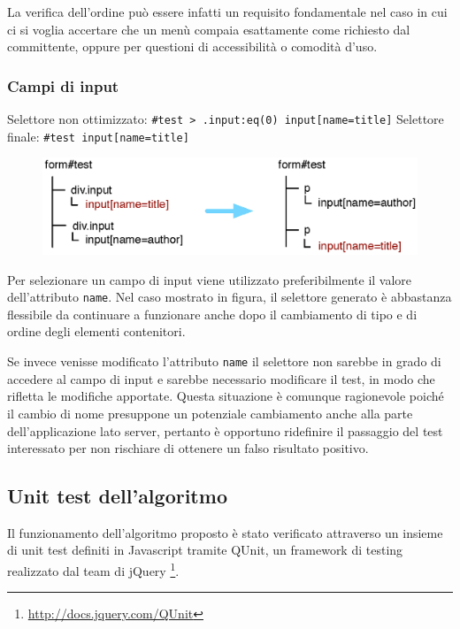 La verifica dell'ordine può essere infatti un requisito fondamentale nel caso in cui ci si voglia accertare che un menù compaia esattamente come richiesto dal committente, oppure per questioni di accessibilità o comodità d'uso.

\subsubsection {Campi di input}

Selettore non ottimizzato:  \verb|#test > .input:eq(0) input[name=title]| 
\newline
Selettore finale:  \verb|#test input[name=title]| 

\begin{figure}[htbp]
\begin{center}
\includegraphics[width=\textwidth]{images/dom_examples/form1.eps}
\end{center}
\end{figure}

Per selezionare un campo di input viene utilizzato preferibilmente il valore dell'attributo \verb|name|. Nel caso mostrato in figura, il selettore generato è abbastanza flessibile da continuare a funzionare anche dopo il cambiamento di tipo e di ordine degli elementi contenitori.

Se invece venisse modificato l'attributo \verb|name| il selettore non sarebbe in grado di accedere al campo di input e sarebbe necessario modificare il test, in modo che rifletta le modifiche apportate. Questa situazione è comunque ragionevole poiché il cambio di nome presuppone un potenziale cambiamento anche alla parte dell'applicazione lato server, pertanto è opportuno ridefinire il passaggio del test interessato per non rischiare di ottenere un falso risultato positivo.

\subsection {Unit test dell'algoritmo}

Il funzionamento dell'algoritmo proposto è stato verificato attraverso un insieme di unit test definiti in Javascript tramite QUnit, un framework di testing realizzato dal team di jQuery \footnote{\url{http://docs.jquery.com/QUnit}}. 

